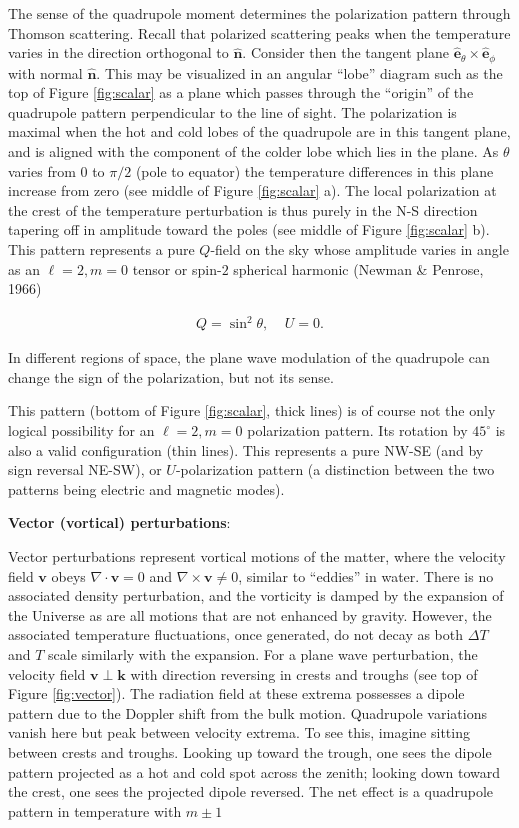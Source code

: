 \documentclass[a4paper,11pt]{article}
\begin{document}
{\noindent}The sense of the quadrupole moment determines the polarization pattern through Thomson scattering. Recall that polarized scattering peaks when the temperature varies in the direction orthogonal to $\bm{\hat{n}}$. Consider then the tangent plane $\bm{\hat{e}}_\theta\times\bm{\hat{e}}_\phi$ with normal $\bm{\hat{n}}$. This may be visualized in an angular ``lobe'' diagram such as the top of Figure \ref{fig:scalar} as a plane which passes through the ``origin'' of the quadrupole pattern perpendicular to the line of sight. The polarization is maximal when the hot and cold lobes of the quadrupole are in this tangent plane, and is aligned with the component of the colder lobe which lies in the plane. As $\theta$ varies from $0$ to $\pi/2$ (pole to equator) the temperature differences in this plane increase from zero (see middle of Figure \ref{fig:scalar} a). The local polarization at the crest of the temperature perturbation is thus purely in the N-S direction tapering off in amplitude toward the poles (see middle of Figure \ref{fig:scalar} b). This pattern represents a pure $Q$-field on the sky whose amplitude varies in angle as an $\ell=2,m=0$ tensor or spin-$2$ spherical harmonic (Newman \& Penrose, 1966)

\begin{align*}
    Q=\sin^2\theta,~~~~~U=0.
\end{align*}

{\noindent}In different regions of space, the plane wave modulation of the quadrupole can change the sign of the polarization, but not its sense.

{\noindent}This pattern (bottom of Figure \ref{fig:scalar}, thick lines) is of course not the only logical possibility for an $\ell=2,m=0$ polarization pattern. Its rotation by $45^\circ$ is also a valid configuration (thin lines). This represents a pure NW-SE (and by sign reversal NE-SW), or $U$-polarization pattern (a distinction between the two patterns being electric and magnetic modes).

{\noindent}\textbf{Vector (vortical) perturbations}:

{\noindent}Vector perturbations represent vortical motions of the matter, where the velocity field $\bm{v}$ obeys $\nabla\cdot\bm{v}=0$ and $\nabla\times\bm{v}\neq0$, similar to ``eddies'' in water. There is no associated density perturbation, and the vorticity is damped by the expansion of the Universe as are all motions that are not enhanced by gravity. However, the associated temperature fluctuations, once generated, do not decay as both $\Delta T$ and $T$ scale similarly with the expansion. For a plane wave perturbation, the velocity field $\bm{v}\perp\bm{k}$ with direction reversing in crests and troughs (see top of Figure \ref{fig:vector}). The radiation field at these extrema possesses a dipole pattern due to the Doppler shift from the bulk motion. Quadrupole variations vanish here but peak between velocity extrema. To see this, imagine sitting between crests and troughs. Looking up toward the trough, one sees the dipole pattern projected as a hot and cold spot across the zenith; looking down toward the crest, one sees the projected dipole reversed. The net effect is a quadrupole pattern in temperature with $m\pm1$
\end{document}

